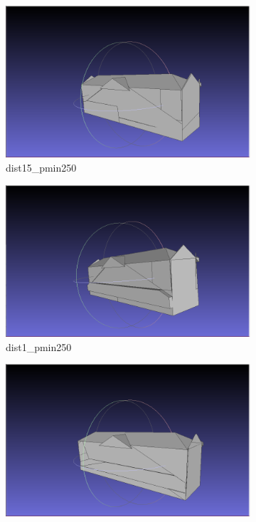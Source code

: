 \documentclass{article}
\begin{document}
  \begin{figure}[H]
    \centering
    \begin{subfigure}[b]{0.45\textwidth}
      \includegraphics[width=\textwidth]{../../images/screen_kinetic/dist1_5_pmin_250.png}
      \caption{dist15\_pmin250}
      \label{fig:dist15_pmin220}
    \end{subfigure}
    \hfill
    \begin{subfigure}[b]{0.45\textwidth}
      \includegraphics[width=\textwidth]{../../images/screen_kinetic/dist1_pmin250.png}
      \caption{dist1\_pmin250}
      \label{fig:dist1_pmin250}
    \end{subfigure}
    \vfill
    \begin{subfigure}[b]{0.45\textwidth}
      \includegraphics[width=\textwidth]{../../images/screen_kinetic/dist_0_3_pmin_250.png}

\end{subfigure}
\end{figure}
\end{document}
